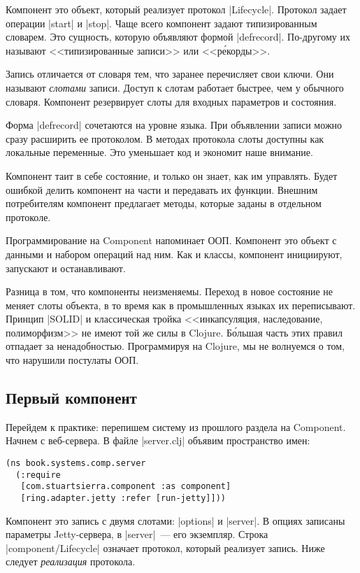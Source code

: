 Компонент это объект, который реализует протокол \spverb|Lifecycle|. Протокол
задает операции \spverb|start| и \spverb|stop|. Чаще всего компонент задают
типизированным словарем. Это сущность, которую объявляют формой
\spverb|defrecord|. По-другому их называют <<типизированные записи>> или
<<р\'{е}корды>>.

Запись отличается от словаря тем, что заранее перечисляет свои ключи. Они
называют \emph{слотами} записи. Доступ к слотам работает быстрее, чем у обычного
словаря. Компонент резервирует слоты для входных параметров и состояния.

Форма \spverb|defrecord| сочетаются на уровне языка. При объявлении записи можно
сразу расширить ее протоколом. В методах протокола слоты доступны как локальные
переменные. Это уменьшает код и экономит наше внимание.

Компонент таит в себе состояние, и только он знает, как им управлять. Будет
ошибкой делить компонент на части и передавать их функции. Внешним потребителям
компонент предлагает методы, которые заданы в отдельном протоколе.

Программирование на Component напоминает ООП. Компонент это объект с данными и
набором операций над ним. Как и классы, компонент инициируют, запускают и
останавливают.

Разница в том, что компоненты неизменяемы. Переход в новое состояние не меняет
слоты объекта, в то время как в промышленных языках их переписывают. Принцип
\spverb|SOLID| и классическая тройка <<инкапсуляция, наследование, полиморфизм>>
не имеют той же силы в Clojure. Б\'{о}льшая часть этих правил отпадает за
ненадобностью. Программируя на Clojure, мы не волнуемся о том, что нарушили
постулаты ООП.

\subsection{Первый компонент}

Перейдем к практике: перепишем систему из прошлого раздела на Component. Начнем
с веб-сервера. В файле \spverb|server.clj| объявим пространство имен:

\begin{verbatim}
(ns book.systems.comp.server
  (:require
   [com.stuartsierra.component :as component]
   [ring.adapter.jetty :refer [run-jetty]]))
\end{verbatim}

Компонент это запись с двумя слотами: \spverb|options| и \spverb|server|. В
опциях записаны параметры Jetty-сервера, в \spverb|server|~--- его
экземпляр. Строка \spverb|component/Lifecycle| означает протокол, который
реализует запись. Ниже следует \emph{реализация} протокола.

